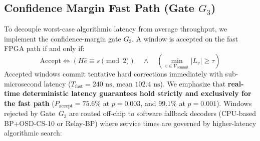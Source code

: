 \documentclass[journal]{IEEEtran}
\begin{document}
\subsection{Confidence Margin Fast Path (Gate $G_3$)}
To decouple worst-case algorithmic latency from average throughput, we implement the confidence-margin gate $G_3$. A window is accepted on the fast FPGA path if and only if:
\begin{equation}
    \text{Accept} \iff (H \hat{e} \equiv s \pmod 2) \quad \land \quad \left( \min_{v \in \mathcal{V}_{\text{commit}}} |L_v| \ge \tau \right)
\end{equation}
Accepted windows commit tentative hard corrections immediately with sub-microsecond latency ($T_{\text{fast}} = 240\text{ ns}$, mean $102.4\text{ ns}$). We emphasize that \textbf{real-time deterministic latency guarantees hold strictly and exclusively for the fast path} ($P_{\text{accept}} = 75.6\%$ at $p = 0.003$, and $99.1\%$ at $p = 0.001$). Windows rejected by Gate~$G_3$ are routed off-chip to software fallback decoders (CPU-based BP+OSD-CS-10 or Relay-BP) where service times are governed by higher-latency algorithmic search:
\end{document}
